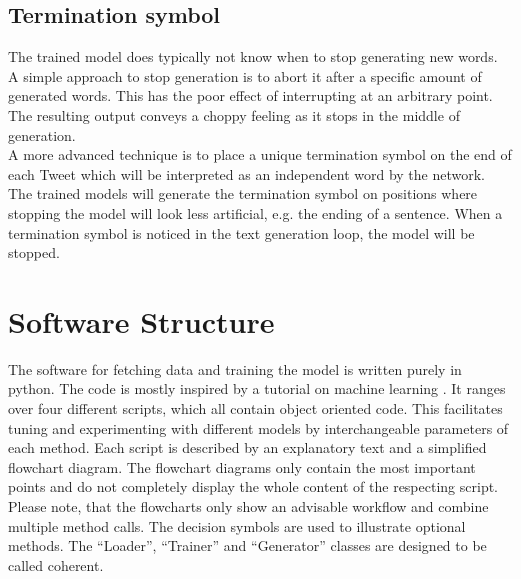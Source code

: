 \documentclass[conference]{IEEEtran}
\begin{document}
\subsection{Termination symbol}

The trained model does typically not know when to stop generating new words. A simple approach to stop generation is to abort it after a specific amount of generated words. This has the poor effect of interrupting at an arbitrary point. The resulting output conveys a choppy feeling as it stops in the middle of generation.\\
A more advanced technique is to place a unique termination symbol on the end of each Tweet which will be interpreted as an independent word by the network. The trained models will generate the termination symbol on positions where stopping the model will look less artificial, e.g. the ending of a sentence. When a termination symbol is noticed in the text generation loop, the model will be stopped.

%

\section{Software Structure}

The software for fetching data and training the model is written purely in python. The code is mostly inspired by a tutorial on machine learning \cite{tutrob}. It ranges over four different scripts, which all contain object oriented code. This facilitates tuning and experimenting with different models by interchangeable parameters of each method. Each script is described by an explanatory text and a simplified flowchart diagram. The flowchart diagrams only contain the most important points and do not completely display the whole content of the respecting script. Please note, that the flowcharts only show an advisable workflow and combine multiple method calls. The decision symbols are used to illustrate optional methods. The ``Loader'', ``Trainer'' and ``Generator'' classes are designed to be called coherent.
\end{document}

